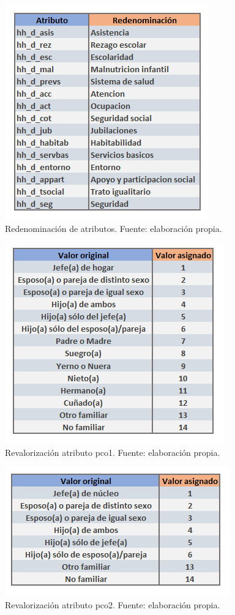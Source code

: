 \documentclass[12pt,letterpaper,spanish]{article}
\begin{document}
    \begin{figure} [H]
        \centering
        \includegraphics{redenominacion.png}
        \caption{Redenominación de atributos. Fuente: elaboración propia.}
        \label{redenominacion}
    \end{figure}

    \begin{figure} [H]
        \centering
        \includegraphics{pco1.png}
        \caption{Revalorización atributo pco1. Fuente: elaboración propia.}
        \label{pco1}
    \end{figure}

    \begin{figure} [H]
        \centering
        \includegraphics{pco2}
        \caption{Revalorización atributo pco2. Fuente: elaboración propia.}
        \label{pco2}
    \end{figure}
\end{document}
